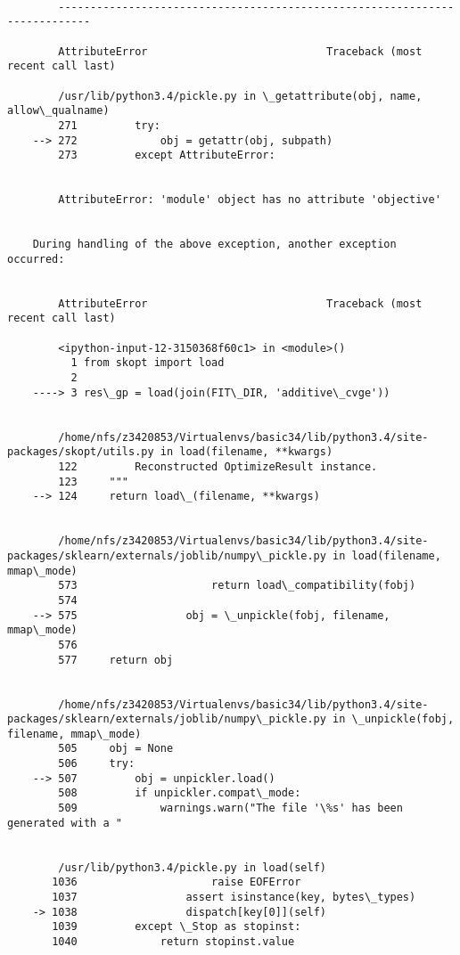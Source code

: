 \documentclass[11pt]{article}
\begin{document}
    \begin{Verbatim}[commandchars=\\\{\}]

        ---------------------------------------------------------------------------

        AttributeError                            Traceback (most recent call last)

        /usr/lib/python3.4/pickle.py in \_getattribute(obj, name, allow\_qualname)
        271         try:
    --> 272             obj = getattr(obj, subpath)
        273         except AttributeError:


        AttributeError: 'module' object has no attribute 'objective'

        
    During handling of the above exception, another exception occurred:


        AttributeError                            Traceback (most recent call last)

        <ipython-input-12-3150368f60c1> in <module>()
          1 from skopt import load
          2 
    ----> 3 res\_gp = load(join(FIT\_DIR, 'additive\_cvge'))
    

        /home/nfs/z3420853/Virtualenvs/basic34/lib/python3.4/site-packages/skopt/utils.py in load(filename, **kwargs)
        122         Reconstructed OptimizeResult instance.
        123     """
    --> 124     return load\_(filename, **kwargs)
    

        /home/nfs/z3420853/Virtualenvs/basic34/lib/python3.4/site-packages/sklearn/externals/joblib/numpy\_pickle.py in load(filename, mmap\_mode)
        573                     return load\_compatibility(fobj)
        574 
    --> 575                 obj = \_unpickle(fobj, filename, mmap\_mode)
        576 
        577     return obj


        /home/nfs/z3420853/Virtualenvs/basic34/lib/python3.4/site-packages/sklearn/externals/joblib/numpy\_pickle.py in \_unpickle(fobj, filename, mmap\_mode)
        505     obj = None
        506     try:
    --> 507         obj = unpickler.load()
        508         if unpickler.compat\_mode:
        509             warnings.warn("The file '\%s' has been generated with a "


        /usr/lib/python3.4/pickle.py in load(self)
       1036                     raise EOFError
       1037                 assert isinstance(key, bytes\_types)
    -> 1038                 dispatch[key[0]](self)
       1039         except \_Stop as stopinst:
       1040             return stopinst.value



\end{Verbatim}
\end{document}
